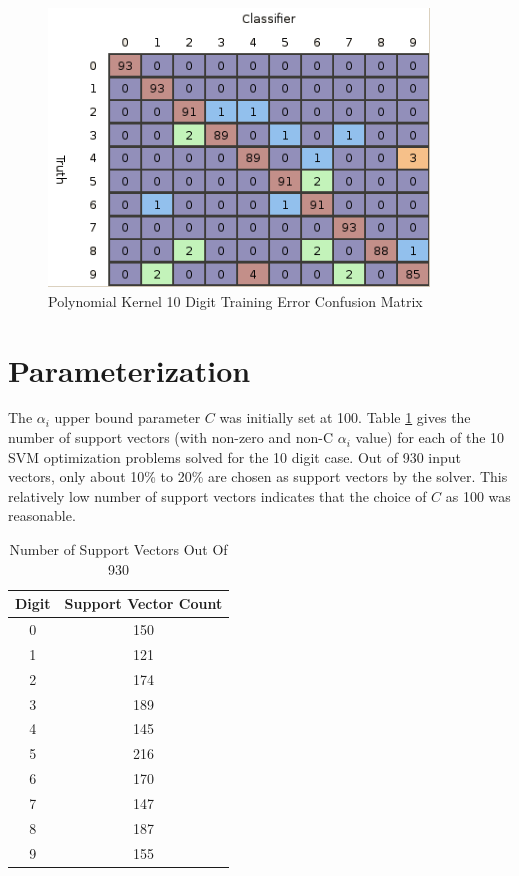 \documentclass{article}
\begin{document}
\begin{figure}
\centering
\includegraphics[width=0.9\textwidth]{images/poly_all_confusion_training.png}
\caption{Polynomial Kernel 10 Digit Training Error Confusion Matrix}
\label{poly10trainconfusion}
\end{figure}

\section{Parameterization}\label{Parameterization}

The \(\alpha_i\) upper bound parameter \(C\) was initially set at 100. Table \ref{svmcount} gives the number of support vectors (with non-zero and non-C \(\alpha_i\) value) for each of the 10 SVM optimization problems solved for the 10 digit case. Out of 930 input vectors, only about 10\% to 20\% are chosen as support vectors by the solver. This relatively low number of support vectors indicates that the choice of \(C\) as 100 was reasonable.

\begin{table}
\caption{Number of Support Vectors Out Of 930}
\begin{center}
\begin{tabular}{cc}
\toprule
Digit & Support Vector Count \\
\midrule
0 & 150 \\
1 & 121 \\
2 & 174 \\
3 & 189 \\
4 & 145 \\
5 & 216 \\
6 & 170 \\
7 & 147 \\
8 & 187 \\
9 & 155 \\
\bottomrule
\end{tabular}
\label{svmcount}
\end{center}
\end{table}
\end{document}
